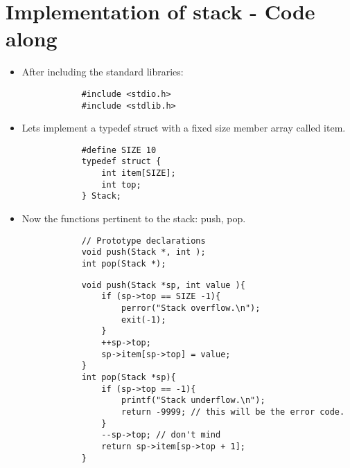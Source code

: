 \section{Implementation of stack - Code along}
\begin{itemize}
    \item After including the standard libraries:
        \begin{verbatim}
            #include <stdio.h>
            #include <stdlib.h>
        \end{verbatim}
    \item Lets implement a typedef struct with a fixed size member array called item.
        \begin{verbatim}
            #define SIZE 10
            typedef struct {
                int item[SIZE];
                int top; 
            } Stack; 
        \end{verbatim}
    
    \item Now the functions pertinent to the stack: push, pop. 
        \begin{verbatim}
            // Prototype declarations
            void push(Stack *, int );
            int pop(Stack *);
        \end{verbatim}
        \begin{verbatim}
            void push(Stack *sp, int value ){
                if (sp->top == SIZE -1){
                    perror("Stack overflow.\n");
                    exit(-1);
                }
                ++sp->top;
                sp->item[sp->top] = value;
            }
            int pop(Stack *sp){
                if (sp->top == -1){
                    printf("Stack underflow.\n");
                    return -9999; // this will be the error code. 
                }
                --sp->top; // don't mind 
                return sp->item[sp->top + 1];
            }
        \end{verbatim}
    

\end{itemize}
